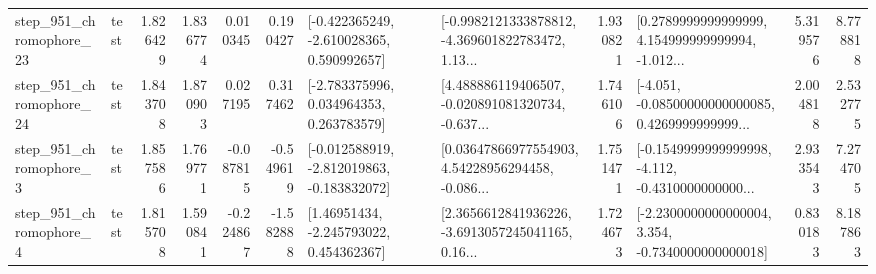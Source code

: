 \begin{tabular}{llrrrrllrlrr}
  step\_951\_chromophore\_23 &      test &      1.826429 &    1.836774 &      0.010345 &  0.190427 &   [-0.422365249, -2.610028365, 0.590992657] &  [-0.9982121333878812, -4.369601822783472, 1.13... &       1.930821 &  [0.2789999999999999, 4.154999999999994, -1.012... &            5.319576 &          8.778818 \\
  step\_951\_chromophore\_24 &      test &      1.843708 &    1.870903 &      0.027195 &  0.317462 &    [-2.783375996, 0.034964353, 0.263783579] &  [4.488886119406507, -0.020891081320734, -0.637... &       1.746106 &  [-4.051, -0.08500000000000085, 0.4269999999999... &            2.004818 &          2.532775 \\
   step\_951\_chromophore\_3 &      test &      1.857586 &    1.769771 &     -0.087815 & -0.549619 &  [-0.012588919, -2.812019863, -0.183832072] &  [0.03647866977554903, 4.54228956294458, -0.086... &       1.751471 &  [-0.1549999999999998, -4.112, -0.4310000000000... &            2.933543 &          7.274705 \\
   step\_951\_chromophore\_4 &      test &      1.815708 &    1.590841 &     -0.224867 & -1.582888 &     [1.46951434, -2.245793022, 0.454362367] &  [2.3656612841936226, -3.6913057245041165, 0.16... &       1.724673 &  [-2.2300000000000004, 3.354, -0.7340000000000018] &            0.830183 &          8.187863 \\
\bottomrule
\end{tabular}

